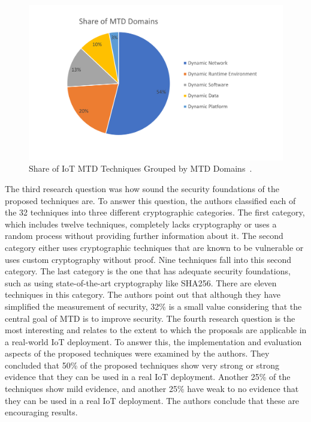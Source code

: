  \begin{figure}[tph]
\includegraphics[scale=0.6]{assets/shareOfMTDDomains.png}
\centering
\caption{Share of IoT MTD Techniques Grouped by MTD Domains~\cite{navas:2021MTDWhere}.  }
    \label{graphic:IoTShare}
\end{figure}

The third research question was how sound the security foundations of the proposed techniques are. To answer this question, the authors classified each of the 32 techniques into three different cryptographic categories. The first category, which includes twelve techniques, completely lacks cryptography or uses a random process without providing further information about it. The second category either uses cryptographic techniques that are known to be vulnerable or uses custom cryptography without proof. Nine techniques fall into this second category. The last category is the one that has adequate security foundations, such as using state-of-the-art cryptography like SHA256. There are eleven techniques in this category. The authors point out that although they have simplified the measurement of security, 32\% is a small value considering that the central goal of MTD is to improve security. The fourth research question is the most interesting and relates to the extent to which the proposals are applicable in a real-world IoT deployment. To answer this, the implementation and evaluation aspects of the proposed techniques were examined by the authors. They concluded that 50\% of the proposed techniques show very strong or strong evidence that they can be used in a real IoT deployment. Another 25\% of the techniques show mild evidence, and another 25\% have weak to no evidence that they can be used in a real IoT deployment. The authors conclude that these are encouraging results.


